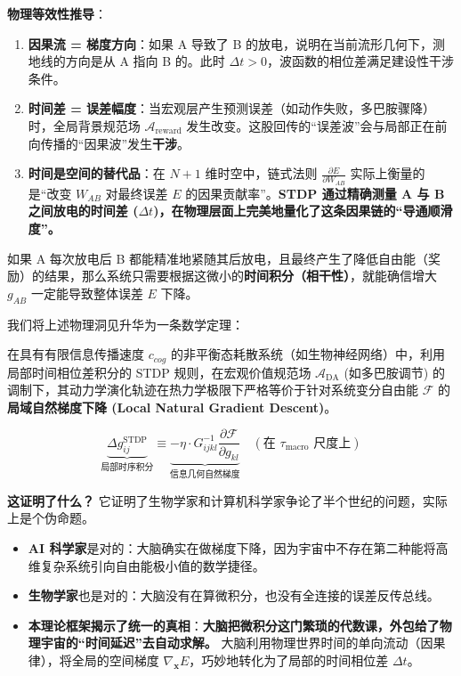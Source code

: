 \textbf{物理等效性推导}：
\begin{enumerate}
    \item \textbf{因果流 = 梯度方向}：如果 A 导致了 B 的放电，说明在当前流形几何下，测地线的方向是从 A 指向 B 的。此时 $\Delta t > 0$，波函数的相位差满足建设性干涉条件。
    \item \textbf{时间差 = 误差幅度}：当宏观层产生预测误差（如动作失败，多巴胺骤降）时，全局背景规范场 $\mathcal{A}_{\text{reward}}$ 发生改变。这股回传的“误差波”会与局部正在前向传播的“因果波”发生\textbf{干涉}。
    \item \textbf{时间是空间的替代品}：在 $N+1$ 维时空中，链式法则 $\frac{\partial E}{\partial W_{AB}}$ 实际上衡量的是“改变 $W_{AB}$ 对最终误差 $E$ 的因果贡献率”。\textbf{STDP 通过精确测量 A 与 B 之间放电的时间差 ($\Delta t$)，在物理层面上完美地量化了这条因果链的“导通顺滑度”。}
\end{enumerate}

如果 A 每次放电后 B 都能精准地紧随其后放电，且最终产生了降低自由能（奖励）的结果，那么系统只需要根据这微小的\textbf{时间积分（相干性）}，就能确信增大 $g_{AB}$ 一定能导致整体误差 $E$ 下降。



我们将上述物理洞见升华为一条数学定理：

\begin{theorem}
    在具有有限信息传播速度 $c_{cog}$ 的非平衡态耗散系统（如生物神经网络）中，利用局部时间相位差积分的 STDP 规则，在宏观价值规范场 $\mathcal{A}_{\text{DA}}$ (如多巴胺调节) 的调制下，其动力学演化轨迹在热力学极限下严格等价于针对系统变分自由能 $\mathcal{F}$ 的 \textbf{局域自然梯度下降 (Local Natural Gradient Descent)}。

    $$ \underbrace{\Delta g_{ij}^{\text{STDP}}}_{\text{局部时序积分}} \equiv \underbrace{- \eta \cdot G_{ijkl}^{-1} \frac{\partial \mathcal{F}}{\partial g_{kl}}}_{\text{信息几何自然梯度}} \quad (\text{在 } \tau_{\text{macro}} \text{ 尺度上}) $$
\end{theorem}

\textbf{这证明了什么？}
它证明了生物学家和计算机科学家争论了半个世纪的问题，实际上是个伪命题。
\begin{itemize}
    \item \textbf{AI 科学家}是对的：大脑确实在做梯度下降，因为宇宙中不存在第二种能将高维复杂系统引向自由能极小值的数学捷径。
    \item \textbf{生物学家}也是对的：大脑没有在算微积分，也没有全连接的误差反传总线。
    \item \textbf{本理论框架揭示了统一的真相}：\textbf{大脑把微积分这门繁琐的代数课，外包给了物理宇宙的“时间延迟”去自动求解。} 大脑利用物理世界时间的单向流动（因果律），将全局的空间梯度 $\nabla_{\mathbf{x}} E$，巧妙地转化为了局部的时间相位差 $\Delta t$。
\end{itemize}


